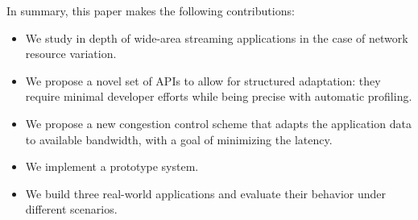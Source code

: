 In summary, this paper makes the following contributions:

\begin{itemize}[leftmargin=16pt]
\item We study in depth of wide-area streaming applications in the case of
  network resource variation.
\item We propose a novel set of APIs to allow for structured adaptation: they
  require minimal developer efforts while being precise with automatic
  profiling.
\item We propose a new congestion control scheme that adapts the application
  data to available bandwidth, with a goal of minimizing the latency.
\item We implement a prototype system.
\item We build three real-world applications and evaluate their behavior
  under different scenarios.
\end{itemize}

\newpage

